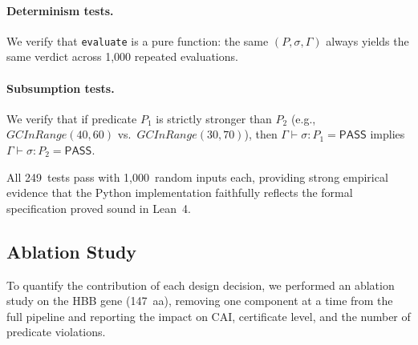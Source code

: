 \documentclass[acmsmall,review,anonymous]{acmart}
\newcommand{\PASS}{\ensuremath{\mathsf{PASS}}\xspace}
\newcommand{\seq}{\sigma}
\newcommand{\pred}{P}
\newcommand{\judg}[3]{#1 \vdash #2 : #3}
\begin{document}
\paragraph{Determinism tests.}
We verify that \texttt{evaluate} is a pure function: the same
$(\pred, \seq, \Gamma)$ always yields the same verdict across 1,000
repeated evaluations.

\paragraph{Subsumption tests.}
We verify that if predicate $\pred_1$ is strictly stronger than
$\pred_2$ (e.g., $\mathit{GCInRange}(40, 60)$ vs.\
$\mathit{GCInRange}(30, 70)$), then $\judg{\Gamma}{\seq}{\pred_1} =
\PASS$ implies $\judg{\Gamma}{\seq}{\pred_2} = \PASS$.

All 249~tests pass with 1,000~random inputs each, providing strong
empirical evidence that the Python implementation faithfully reflects
the formal specification proved sound in Lean~4.

\subsection{Ablation Study}\label{sec:ablation}

To quantify the contribution of each design decision, we performed an
ablation study on the HBB gene (147~aa), removing one component at a
time from the full pipeline and reporting the impact on CAI, certificate
level, and the number of predicate violations.
\end{document}

